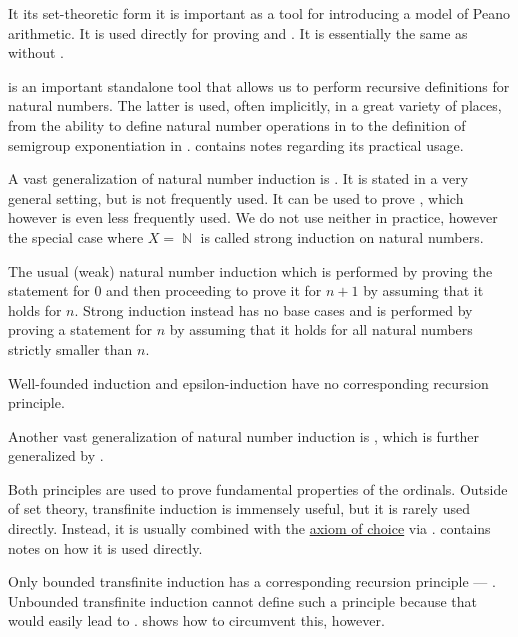 \begin{remark}
\begin{thmenum}
    It its set-theoretic form  it is important as a tool for introducing a model of Peano arithmetic. It is used directly for proving  and . It is essentially the same as  without .

     is an important standalone tool that allows us to perform recursive definitions for natural numbers. The latter is used, often implicitly, in a great variety of places, from the ability to define natural number operations in  to the definition of semigroup exponentiation in .  contains notes regarding its practical usage.

     A vast generalization of natural number induction is . It is stated in a very general setting, but is not frequently used. It can be used to prove , which however is even less frequently used. We do not use neither in practice, however the special case where \( X = \BbbN \) is called strong induction on natural numbers.

    The usual (weak) natural number induction which is performed by proving the statement for \( 0 \) and then proceeding to prove it for \( n + 1 \) by assuming that it holds for \( n \). Strong induction instead has no base cases and is performed by proving a statement for \( n \) by assuming that it holds for all natural numbers strictly smaller than \( n \).

    Well-founded induction and epsilon-induction have no corresponding recursion principle.

     Another vast generalization of natural number induction is , which is further generalized by .

    Both principles are used to prove fundamental properties of the ordinals. Outside of set theory, transfinite induction is immensely useful, but it is rarely used directly. Instead, it is usually combined with the \hyperref[def:zfc/choice]{axiom of choice} via .  contains notes on how it is used directly.

    Only bounded transfinite induction has a corresponding recursion principle --- . Unbounded transfinite induction cannot define such a principle because that would easily lead to .  shows how to circumvent this, however.


\end{thmenum}
\end{remark}
